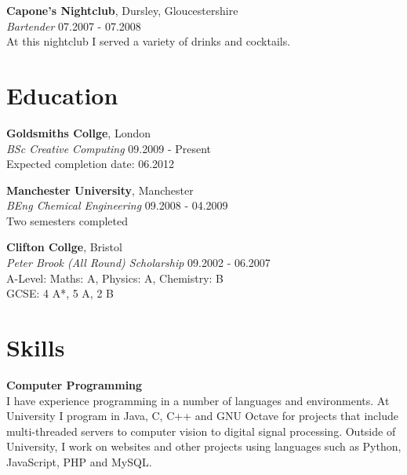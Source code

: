 \documentclass[margin,line,a4paper]{resume}
\begin{document}
\begin{resume}
\textbf{Capone's Nightclub}, Dursley, Gloucestershire  \vspace{1mm}\\
\textsl{Bartender} \hfill 07.2007 - 07.2008 \vspace{2mm} \\
At this nightclub I served a variety of drinks and cocktails.

\section{\mysidestyle Education}

\textbf{Goldsmiths Collge}, London \vspace{1mm}\\
\textsl{BSc Creative Computing} \hfill 09.2009 - Present \vspace{2mm} \\
Expected completion date: 06.2012

\textbf{Manchester University}, Manchester \vspace{1mm}\\
\textsl{BEng Chemical Engineering} \hfill 09.2008 - 04.2009 \vspace{2mm} \\
Two semesters completed 

\textbf{Clifton Collge}, Bristol \vspace{1mm}\\
\textsl{Peter Brook (All Round) Scholarship} \hfill 09.2002 - 06.2007 \vspace{2mm} \\
A-Level: Maths: A, Physics: A, Chemistry: B \\
GCSE: 4 A*, 5 A, 2 B \\


\section{\mysidestyle Skills}

\textbf{Computer Programming} \vspace{1mm} \\
I have experience programming in a number of languages and environments. At University I program in Java, C, C++ and GNU Octave for projects that include multi-threaded servers to computer vision to digital signal processing. Outside of University, I work on websites and other projects using languages such as Python, JavaScript, PHP and MySQL.


\end{resume}
\end{document}
